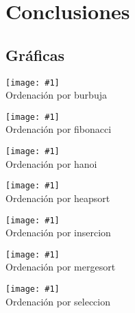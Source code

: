 \documentclass[a4paper, 11pt]{article} %
\newcommand{\imagen}[2]{\begin{figure*}[ht!] \centering \texttt{[image: \#1]} \\ #2 \end{figure*}}
\begin{document}
\section {Conclusiones}
\subsection {Gráficas}
\imagen{../regressionPlots/burbuja_fit.jpg}{Ordenación por burbuja}

\imagen{../regressionPlots/fibonacci_fit.jpg}{Ordenación por fibonacci}


\imagen{../regressionPlots/hanoi_fit.jpg}{Ordenación por hanoi}

\imagen{../regressionPlots/heapsort_fit.jpg}{Ordenación por heapsort}

\imagen{../regressionPlots/insercion_fit.jpg}{Ordenación por insercion}

\imagen{../regressionPlots/mergesort_fit.jpg}{Ordenación por mergesort}


\imagen{../regressionPlots/seleccion_fit.jpg}{Ordenación por seleccion}
\end{document}
